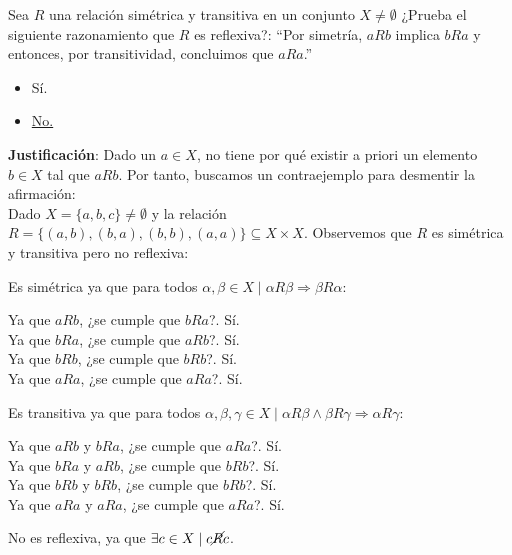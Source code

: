 \begin{ejercicio}
    Sea $R$ una relación simétrica y transitiva en un conjunto $X \neq \emptyset$ ¿Prueba el siguiente razonamiento que $R$ es reflexiva?:\newline
    ``Por simetría, $aRb$ implica $bRa$ y entonces, por transitividad, concluimos que $aRa$.''
    \begin{itemize}
        \item Sí.
        \item \underline{No.}
    \end{itemize}

    \noindent
    \textbf{Justificación}:
    Dado un $a \in X$, no tiene por qué existir a priori un elemento $b \in X$ tal que $aRb$. Por tanto, buscamos un contraejemplo para desmentir la afirmación:\\

    \noindent
    Dado $X = \{ a,b,c \} \neq \emptyset$ y la relación $R = \{ (a,b), (b,a), (b,b),(a,a) \} \subseteq X \times X$. \newline Observemos que $R$ es simétrica y transitiva pero no reflexiva:

    \noindent
    Es simétrica ya que para todos $\alpha, \beta \in X \mid \alpha R \beta \Rightarrow \beta R \alpha$:
    \begin{center}
        Ya que $aRb$, ¿se cumple que $bRa$?. Sí.\\
        Ya que $bRa$, ¿se cumple que $aRb$?. Sí.\\
        Ya que $bRb$, ¿se cumple que $bRb$?. Sí.\\
        Ya que $aRa$, ¿se cumple que $aRa$?. Sí.
    \end{center}
    Es transitiva ya que para todos $\alpha, \beta, \gamma \in X \mid \alpha R \beta \land \beta R \gamma \Rightarrow \alpha R \gamma$:
    \begin{center}
        Ya que $aRb$ y $bRa$, ¿se cumple que $aRa$?. Sí.\\
        Ya que $bRa$ y $aRb$, ¿se cumple que $bRb$?. Sí.\\
        Ya que $bRb$ y $bRb$, ¿se cumple que $bRb$?. Sí.\\
        Ya que $aRa$ y $aRa$, ¿se cumple que $aRa$?. Sí.
    \end{center}
    No es reflexiva, ya que $\exists c \in X \mid c\cancel{R}c$.
\end{ejercicio}

\newpage
\resetearcontador

